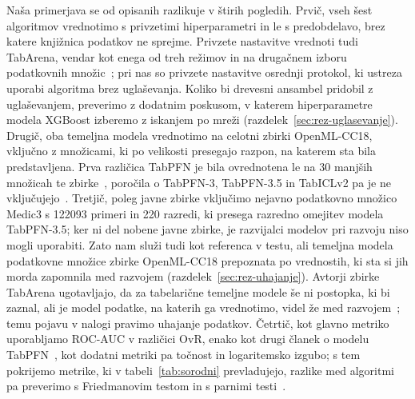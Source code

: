 \documentclass[a4paper,12pt,openright]{book}
\begin{document}
Naša primerjava se od opisanih razlikuje v štirih pogledih. Prvič, vseh šest
algoritmov vrednotimo s privzetimi hiperparametri in le s predobdelavo, brez
katere knjižnica podatkov ne sprejme. Privzete nastavitve vrednoti tudi
TabArena, vendar kot enega od treh režimov in na drugačnem izboru podatkovnih
množic~\cite{erickson2025tabarena}; pri nas so privzete nastavitve osrednji
protokol, ki ustreza uporabi algoritma brez uglaševanja. Koliko bi drevesni
ansambel pridobil z uglaševanjem, preverimo z dodatnim poskusom, v katerem
hiperparametre modela XGBoost izberemo z iskanjem po mreži (razdelek~\ref{sec:rez-uglasevanje}).
Drugič, oba temeljna modela vrednotimo na celotni zbirki OpenML-CC18, vključno z
množicami, ki po velikosti presegajo razpon, na katerem sta bila predstavljena.
Prva različica TabPFN je bila ovrednotena le na 30 manjših množicah te
zbirke~\cite{hollmann2023tabpfn}, poročila o TabPFN-3, TabPFN-3.5 in TabICLv2
pa je ne
vključujejo~\cite{grinsztajn2026tabpfn3,jager2026tabpfn35,qu2026tabiclv2}.
Tretjič, poleg javne zbirke vključimo nejavno podatkovno množico Medic3 s
\num{122093} primeri in 220 razredi, ki presega razredno omejitev modela
TabPFN-3.5; ker ni del nobene javne zbirke, je razvijalci modelov pri razvoju
niso mogli uporabiti. Zato nam služi tudi kot referenca v testu, ali temeljna
modela podatkovne množice zbirke OpenML-CC18 prepoznata po vrednostih, ki sta
si jih morda zapomnila med razvojem (razdelek~\ref{sec:rez-uhajanje}). Avtorji
zbirke TabArena ugotavljajo, da za tabelarične temeljne modele še ni postopka,
ki bi zaznal, ali je model podatke, na katerih ga vrednotimo, videl že med
razvojem~\cite{erickson2025tabarena}; temu pojavu v nalogi pravimo uhajanje
podatkov.
Četrtič, kot glavno metriko uporabljamo ROC-AUC v
različici OvR, enako kot drugi članek o modelu TabPFN~\cite{hollmann2025tabpfn},
kot dodatni metriki pa točnost in logaritemsko izgubo; s tem pokrijemo
metrike, ki v tabeli~\ref{tab:sorodni} prevladujejo, razlike med algoritmi pa
preverimo s Friedmanovim testom in s parnimi
testi~\cite{demsar2006statistical,benavoli2016should}.
\end{document}
